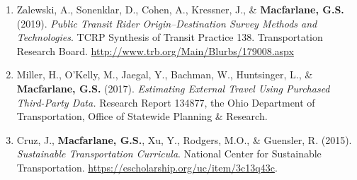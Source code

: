 \documentclass[margin,line]{res}
\newif\ifdetail
\newcounter{enuminitialize}
\newenvironment{myenum}[1][]
{%
 \setcounter{enuminitialize}{#1}
 \addtocounter{enuminitialize}{2}
 \begin{enumerate}[left= 4pt, itemsep=12pt, start=\value{enuminitialize}, label=\arabic*\addtocounter{enumi}{-2}]
}
{%
 \end{enumerate}
}
\begin{document}
\begin{resume}
\begin{myenum}[6]
\item Zalewski, A., Sonenklar, D., Cohen, A., Kressner, J., \& \textbf{Macfarlane, G.S.} (2019). \textit{ Public Transit Rider Origin–Destination Survey Methods and Technologies}. TCRP Synthesis of Transit Practice 138. Transportation Research Board. \url{http://www.trb.org/Main/Blurbs/179008.aspx} \ifdetail Citations: 1  \fi

\item Miller, H., O'Kelly, M., Jaegal, Y., Bachman, W., Huntsinger, L., \& \textbf{Macfarlane, G.S.} (2017). \textit{Estimating External Travel Using Purchased Third-Party Data.} Research Report 134877, the Ohio Department of Transportation, Office of Statewide Planning \& Research. \ifdetail Citations: 1  \fi

\item Cruz, J., \textbf{Macfarlane, G.S.}, Xu, Y., Rodgers, M.O., \& Guensler, R. (2015). \textit{Sustainable Transportation Curricula}. National Center for Sustainable Transportation. \url{https://escholarship.org/uc/item/3c13q43c}.
\end{myenum}

\noindent\makebox[\linewidth]{\rule{\linewidth}{0.4pt}}

\end{resume}
\end{document}
